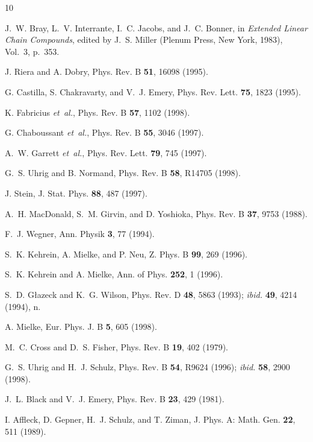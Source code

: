 %
%
\begin{thebibliography}{10}

J.~W. Bray, L.~V. Interrante, I.~C. Jacobs, and J.~C. Bonner,  in {\em Extended
  Linear Chain Compounds}, edited by J.~S. Miller (Plenum Press, New York,
  1983), Vol.~3, p.\ 353.

J. Riera and A. Dobry, Phys. Rev. B {\bf 51},  16098  (1995).

G. Castilla, S. Chakravarty, and V.~J. Emery, Phys. Rev. Lett. {\bf 75},  1823
  (1995).

K. Fabricius {\it et~al.}, Phys. Rev. B {\bf 57},  1102  (1998).

G. Chaboussant {\it et~al.}, Phys. Rev. B {\bf 55},  3046  (1997).

A.~W. Garrett {\it et~al.}, Phys. Rev. Lett. {\bf 79},  745  (1997).

G.~S. Uhrig and B. Normand, Phys. Rev. B {\bf 58},  R14705  (1998).

J. Stein, J. Stat. Phys. {\bf 88},  487  (1997).

A.~H. MacDonald, S.~M. Girvin, and D. Yoshioka, Phys. Rev. B {\bf 37}, 
9753  (1988).

F.~J. Wegner, Ann. Physik {\bf 3},  77  (1994).

S.~K. Kehrein, A. Mielke, and P. Neu, Z. Phys. B {\bf 99},  269  (1996).

S.~K. Kehrein and A. Mielke, Ann. of Phys. {\bf 252},  1  (1996).

S.~D. G{\l}azeck and K.~G. Wilson, Phys. Rev. D {\bf 48},  5863  (1993);
{\it ibid.} {\bf 49},  4214  (1994), n.

A. Mielke, Eur. Phys. J. B {\bf 5},  605  (1998).

M.~C. Cross and D.~S. Fisher, Phys. Rev. B {\bf 19},  402  (1979).

G.~S. Uhrig and H.~J. Schulz, Phys. Rev. B {\bf 54},  R9624  (1996);
{\it ibid.} {\bf 58},  2900  (1998).

J.~L. Black and V.~J. Emery, Phys. Rev. B {\bf 23},  429  (1981).

I. Affleck, D. Gepner, H.~J. Schulz, and T. Ziman, J. Phys. A: Math. Gen. {\bf
  22},  511  (1989).


\end{thebibliography}
